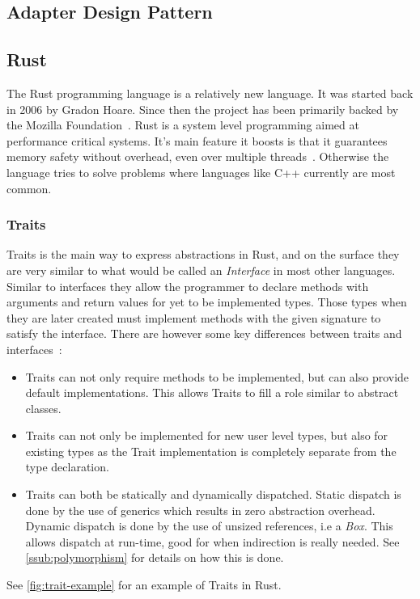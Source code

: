 \documentclass[conference]{IEEEtran}
\begin{document}
\subsection{Adapter Design Pattern}
\label{sub:adapter_design_pattern}

\subsection{Rust}
\label{sub:rust}
The Rust programming language is a relatively new language.
It was started back in 2006 by Gradon Hoare.
Since then the project has been primarily backed by the Mozilla Foundation~\cite{rustorg2017:faq}.
Rust is a system level programming aimed at performance critical systems.
It's main feature it boosts is that it guarantees memory safety without overhead, even over multiple threads~\cite{matsakis:2014:rustlang}.
Otherwise the language tries to solve problems where languages like C++ currently are most common.

\subsubsection{Traits}
\label{ssub:traits}
Traits is the main way to express abstractions in Rust, and on the surface they are very similar to what would be called an \emph{Interface} in most other languages.
Similar to interfaces they allow the programmer to declare methods with arguments and return values for yet to be implemented types.
Those types when they are later created must implement methods with the given signature to satisfy the interface. 
There are however some key differences between traits and interfaces~\cite{rustblog2015:traits}:

\begin{itemize}
    \item 
        Traits can not only require methods to be implemented, but can also provide default implementations. This allows Traits to fill a role similar to abstract classes.
    \item 
        Traits can not only be implemented for new user level types, but also for existing types as the Trait implementation is completely separate from the type declaration.
    \item 
        Traits can both be statically and dynamically dispatched.
        Static dispatch is done by the use of generics which results in zero abstraction overhead.
        Dynamic dispatch is done by the use of unsized references, i.e a \emph{Box}.
        This allows dispatch at run-time, good for when indirection is really needed.
        See \autoref{ssub:polymorphism} for details on how this is done.
\end{itemize}
See \autoref{fig:trait-example} for an example of Traits in Rust.
\end{document}
